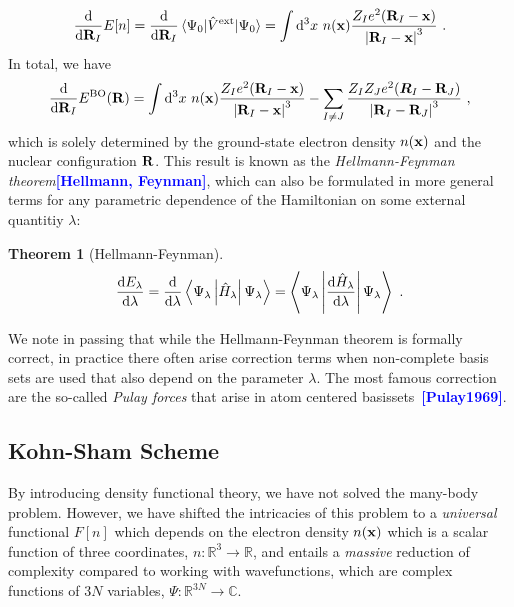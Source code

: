 \documentclass[a4paper,12pt]{book}
\renewcommand{\d}{{\rm d}}
\renewcommand{\b}[1]{\boldsymbol{#1}}
\newcommand{\CITE}[1]{\textcolor{blue}{{\bf [#1]}}}
\newtheorem*{theorem}{Theorem}
\begin{document}
\begin{align}
	\frac{\d}{\d {\bf R}_I} E[n]
		= \frac{\d}{\d {\bf R}_I} \braket{\Psi_0 | \hat V ^{\rm ext} | \Psi_0} 
		= \int \d^3 x ~ n({\bf x}) \frac{Z_I e^2 ({\bf R}_I - {\bf x})}{\left\lvert {\bf R}_I - {\bf x} \right\rvert^3}~.
\end{align}
In total, we have
\begin{align}
	\frac{\d}{\d {\bf R}_I} E^{\rm BO} ({\bf R})
	= \int \d^3 x ~ n({\bf x}) \frac{Z_I e^2 ({\bf R}_I - {\bf x})}{\left\lvert {\bf R}_I - {\bf x} \right\rvert^3}
	- \sum_{I \neq J} \frac{Z_I Z_J e^2 ({\b R}_{I}-{\bf R}_{J})}{
		\left\lvert {\bf R}_{I}-{\bf R}_{J} \right\rvert^3}~,
	\label{eq:hellmannfeynman.force}
\end{align}
which is solely determined by the ground-state electron density $n ({\bf x})$ and the nuclear configuration $\bf R$. This result is known as the \emph{Hellmann-Feynman theorem}\CITE{Hellmann, Feynman}, which can also be formulated in more general terms for any parametric dependence of the Hamiltonian on some external quantitiy $\lambda$:
\begin{theorem}[Hellmann-Feynman]
\begin{align}
	\frac{\d E_{\lambda}}{\d \lambda}
		= \frac{\d}{\d \lambda}\left\langle\Psi_{\lambda} \left|\hat{H}_{\lambda}\right| \Psi_{\lambda} \right\rangle
		= \left\langle\Psi_{\lambda} \left| \frac{\d \hat{H}_{\lambda}}{\d \lambda} \right| \Psi_{\lambda} \right\rangle~.
\end{align}
\end{theorem}
We note in passing that while the Hellmann-Feynman theorem is formally correct, in practice there often arise correction terms when non-complete basis sets are used that also depend on the parameter $\lambda$. The most famous correction are the so-called \emph{Pulay forces} that arise in atom centered basissets~\CITE{Pulay1969}.

\subsection{Kohn-Sham Scheme}
By introducing density functional theory, we have not solved the many-body problem. However, we have shifted the intricacies of this problem to a \emph{universal} functional $F[n]$ which depends on the electron density $n({\bf x})$ which is a scalar function of three coordinates, $n: \mathds R^3 \rightarrow \mathds R$, and entails a \emph{massive} reduction of complexity compared to working with wavefunctions, which are complex functions of $3N$ variables, $\Psi: \mathds R^{3N} \rightarrow \mathds C$.
\end{document}
